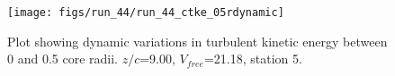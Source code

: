\begin{figure}[H]
\centering
\texttt{[image: figs/run\_44/run\_44\_ctke\_05rdynamic]}
\caption{Plot showing dynamic variations in turbulent kinetic energy between 0 and 0.5 core radii. $z/c$=9.00, $V_{free}$=21.18, station 5.}
\label{fig:run_44_ctke_05rdynamic}
\end{figure}


